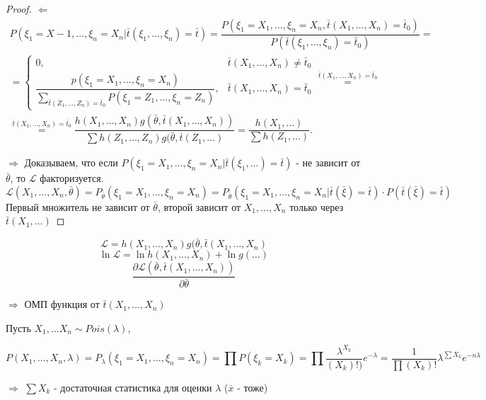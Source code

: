 \begin{proof}
  $\boxed{\Leftarrow}$ 
  \begin{multline*}
    P(\xi_1 = X-1, \dots, \xi_n = X_n | \bar t (\xi_1, \dots, \xi_n) = \bar t)
    = \dfrac{P(\xi_1=X_1, \dots, \xi_n = X_n, \bar t(X_1, \dots, X_n) = \bar t_0)}{P(\bar t(\xi_1, \dots, \xi_n) = \bar t_0)} = \\
    = \begin{cases}
      0, &\bar t(X_1, \dots, X_n) \neq \bar t_0 \\
      \dfrac{p(\xi_1 = X_1, \dots, \xi_n = X_n)}{\sum_{\bar t(Z_1, \dots, Z_n) = \bar t_0} P(\xi_1 = Z_1, \dots, \xi_n = Z_n)}, &\bar t(X_1, \dots, X_n) = \bar t_0
    \end{cases} \stackrel{\bar t(X_1, \dots, X_n) = \bar t_0}{=} \\
    \stackrel{\bar t(X_1, \dots, X_n) = \bar t_0}{=} \dfrac{h(X_1, \dots, X_n) g(\bar \theta, \bar t(X_1, \dots, X_n))}{\sum h(Z_1, \dots, Z_n) g(\bar\theta, \bar t(Z_1, \dots)} = \dfrac{h(X_1, \dots)}{\sum h(Z_1, \dots)}.
  \end{multline*}

  $\boxed{\Rightarrow}$
  Доказываем, что если $P(\xi_1 = X_1, \dots, \xi_n = X_n | \bar t(\xi_1, \dots) = \bar t)$ - не зависит от $\bar \theta$, то $\mathcal{L}$ факторизуется.
  \begin{equation*}
    \mathcal{L} (X_1, \dots, X_n, \bar\theta) = P_{\bar\theta} (\xi_1 = X_1, \dots, \xi_n = X_n) = P_{\bar\theta} (\xi_1 = X_1, \dots, \xi_n = X_n | \bar t(\bar\xi) = \bar t) \cdot P(\bar t(\bar\xi) = \bar t)
  \end{equation*}
  Первый множитель не зависит от $\bar\theta$, второй зависит от $X_1, \dots, X_n$ только через $\bar t(X_1, \dots)$
\end{proof}

\begin{remark}
  \[
    \mathcal{L} = h(X_1, \dots, X_n) g(\bar\theta, \bar t(X_1, \dots, X_n)
  \]
  \[
    \ln \mathcal{L} = \ln h(X_1, \dots, X_n) + \ln g(\dots)
  \]
  \[
    \dfrac{\partial \mathcal{L} (\bar\theta, \bar t(X_1, \dots, X_n))}{\partial \bar\theta}  
  \]

  $\Rightarrow$ ОМП функция от $\bar t(X_1, \dots, X_n)$

\end{remark}

\begin{ex}
  Пусть $X_1, \dots X_n \sim Pois(\lambda)$, 

  \[
    P(X_1, \dots, X_n, \lambda) = P_\lambda (\xi_1=X_1, \dots, \xi_n=X_n) = \prod P(\xi_k = X_k) = \prod \dfrac{\lambda^{X_k}}{(X_k)!)} e^{-\lambda} = \dfrac{1}{\prod (X_k)!} \lambda^{\sum X_k} e^{-n\lambda}
  \]

  $\Rightarrow$ $\sum X_k$ - достаточная статистика для оценки $\lambda$ ($\bar x$ - тоже)
\end{ex}

